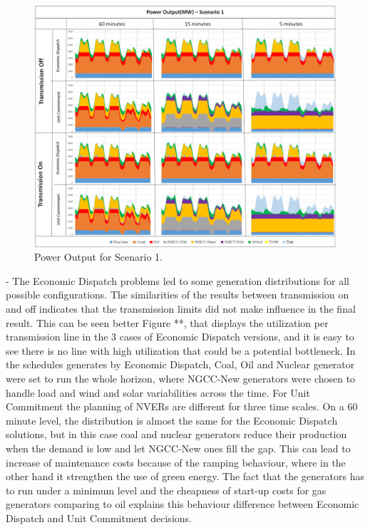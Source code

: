 \documentclass[12pt,LUDisStyle,twosided]{book}
\begin{document}
\begin{figure} 
  \centering
  
	  \includegraphics[width=\textwidth,height=\textheight,keepaspectratio]{PowerOutputScenario1.png}
  
  \caption{Power Output for Scenario 1.}
  \label{fig:powerOutputScenario1}
\end{figure}



- The Economic Dispatch problems led to some generation distributions for all possible configurations. The similarities of the results between transmission on and off indicates that the transmission limits did not make influence in the final result. This can be seen better Figure **, that displays the utilization per transmission line in the 3 cases of Economic Dispatch versions, and it is easy to see there is no line with high utilization that could be a potential bottleneck. In the schedules generates by Economic Dispatch, Coal, Oil and Nuclear generator were set to run the whole horizon, where NGCC-New generators were chosen to handle load and wind and solar variabilities across the time. For Unit Commitment the planning of NVERs are different for three time scales. On a 60 minute level, the distribution is almost the same for the Economic Dispatch solutions, but in this case coal and nuclear generators reduce their production when the demand is low and let NGCC-New ones fill the gap. This can lead to increase of maintenance costs because of the ramping behaviour, where in the other hand it strengthen the use of green energy. The fact that the generators has to run under a minimum level and the cheapness of start-up costs for gas generators comparing to oil explains this behaviour difference between Economic Dispatch and Unit Commitment decisions.
\end{document}
